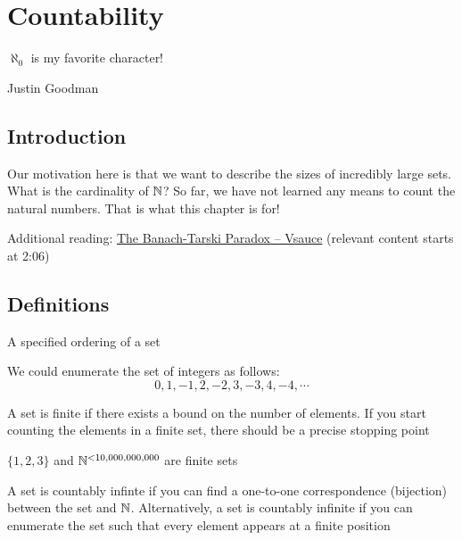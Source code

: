 \documentclass[main.tex]{subfiles}
\begin{document}
\chapter{Countability}
\label{chapter:countability}

\epigraph{\(\aleph_0\) is my favorite character!}{Justin Goodman}

\minitoc

\section{Introduction}

Our motivation here is that we want to describe the sizes of incredibly large sets. What is the cardinality of \(\mathbb{N}\)? So far, we have not learned any means to count the natural numbers. That is what this chapter is for!

Additional reading: \href{https://youtu.be/s86-Z-CbaHA}{The Banach-Tarski Paradox -- Vsauce} (relevant content starts at 2:06)

\section{Definitions}

\begin{defn}
	A specified ordering of a set
\end{defn}

\begin{example}
	We could enumerate the set of integers as follows: \[0,1,-1,2,-2,3,-3,4,-4,\cdots\]
\end{example}

\begin{defn}[Finite]
	A set is finite if there exists a bound on the number of elements. If you start counting the elements in a finite set, there should be a precise stopping point
\end{defn}

\begin{example}
	\(\{1,2,3\}\) and \(\mathbb{N}^{< 10,000,000,000}\) are finite sets
\end{example}

\begin{defn}
	A set is countably infinte if you can find a one-to-one correspondence (bijection) between the set and \(\mathbb{N}\). Alternatively, a set is countably infinite if you can enumerate the set such that every element appears at a finite position
\end{defn}
\end{document}
